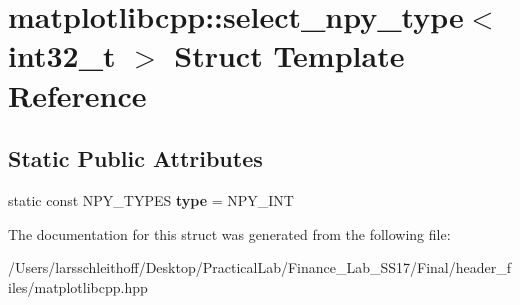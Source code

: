 \hypertarget{structmatplotlibcpp_1_1select__npy__type_3_01int32__t_01_4}{}\section{matplotlibcpp\+:\+:select\+\_\+npy\+\_\+type$<$ int32\+\_\+t $>$ Struct Template Reference}
\label{structmatplotlibcpp_1_1select__npy__type_3_01int32__t_01_4}
\subsection*{Static Public Attributes}
\begin{DoxyCompactItemize}
\item 
\mbox{\label{structmatplotlibcpp_1_1select__npy__type_3_01int32__t_01_4_abcfd0c3dc5d5e92575c04747315cb4d5}} 
static const N\+P\+Y\+\_\+\+T\+Y\+P\+ES {\bfseries type} = N\+P\+Y\+\_\+\+I\+NT
\end{DoxyCompactItemize}


The documentation for this struct was generated from the following file\+:\begin{DoxyCompactItemize}
\item 
/\+Users/larsschleithoff/\+Desktop/\+Practical\+Lab/\+Finance\+\_\+\+Lab\+\_\+\+S\+S17/\+Final/header\+\_\+files/matplotlibcpp.\+hpp\end{DoxyCompactItemize}
